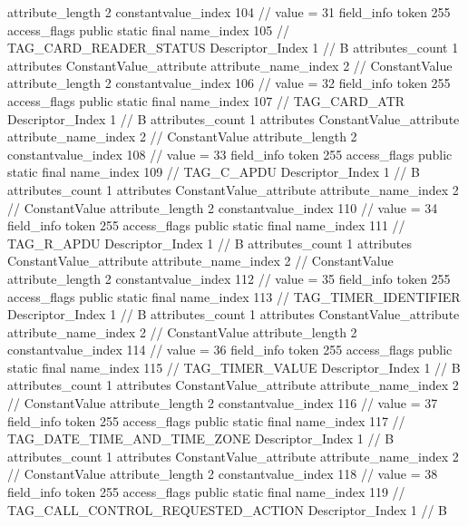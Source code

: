 {{{{{{{					attribute_length	2
					constantvalue_index	104		// value = 31
				}
				}
			}
			field_info {
				token	255
				access_flags	public static final
				name_index	105		// TAG_CARD_READER_STATUS
				Descriptor_Index	1		// B
				attributes_count	1
				attributes {
				ConstantValue_attribute {
					attribute_name_index	2		// ConstantValue
					attribute_length	2
					constantvalue_index	106		// value = 32
				}
				}
			}
			field_info {
				token	255
				access_flags	public static final
				name_index	107		// TAG_CARD_ATR
				Descriptor_Index	1		// B
				attributes_count	1
				attributes {
				ConstantValue_attribute {
					attribute_name_index	2		// ConstantValue
					attribute_length	2
					constantvalue_index	108		// value = 33
				}
				}
			}
			field_info {
				token	255
				access_flags	public static final
				name_index	109		// TAG_C_APDU
				Descriptor_Index	1		// B
				attributes_count	1
				attributes {
				ConstantValue_attribute {
					attribute_name_index	2		// ConstantValue
					attribute_length	2
					constantvalue_index	110		// value = 34
				}
				}
			}
			field_info {
				token	255
				access_flags	public static final
				name_index	111		// TAG_R_APDU
				Descriptor_Index	1		// B
				attributes_count	1
				attributes {
				ConstantValue_attribute {
					attribute_name_index	2		// ConstantValue
					attribute_length	2
					constantvalue_index	112		// value = 35
				}
				}
			}
			field_info {
				token	255
				access_flags	public static final
				name_index	113		// TAG_TIMER_IDENTIFIER
				Descriptor_Index	1		// B
				attributes_count	1
				attributes {
				ConstantValue_attribute {
					attribute_name_index	2		// ConstantValue
					attribute_length	2
					constantvalue_index	114		// value = 36
				}
				}
			}
			field_info {
				token	255
				access_flags	public static final
				name_index	115		// TAG_TIMER_VALUE
				Descriptor_Index	1		// B
				attributes_count	1
				attributes {
				ConstantValue_attribute {
					attribute_name_index	2		// ConstantValue
					attribute_length	2
					constantvalue_index	116		// value = 37
				}
				}
			}
			field_info {
				token	255
				access_flags	public static final
				name_index	117		// TAG_DATE_TIME_AND_TIME_ZONE
				Descriptor_Index	1		// B
				attributes_count	1
				attributes {
				ConstantValue_attribute {
					attribute_name_index	2		// ConstantValue
					attribute_length	2
					constantvalue_index	118		// value = 38
				}
				}
			}
			field_info {
				token	255
				access_flags	public static final
				name_index	119		// TAG_CALL_CONTROL_REQUESTED_ACTION
				Descriptor_Index	1		// B
}}}}}

